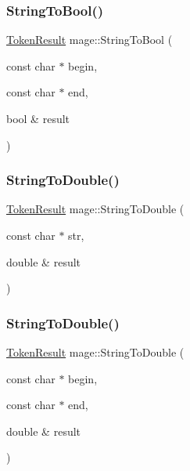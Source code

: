 \hypertarget{namespacemage_a5deef7799d080b8c98c9ead54fbcb6db}{}\label{namespacemage_a5deef7799d080b8c98c9ead54fbcb6db} 
\subsubsection{\texorpdfstring{String\+To\+Bool()}{StringToBool()}\hspace{0.1cm}{\footnotesize\ttfamily [2/2]}}
{\footnotesize\ttfamily \hyperlink{namespacemage_a2178ba2411db5912f41b2e7698c2037d}{Token\+Result} mage\+::\+String\+To\+Bool (\begin{DoxyParamCaption}\item[{const char $\ast$}]{begin,  }\item[{const char $\ast$}]{end,  }\item[{bool \&}]{result }\end{DoxyParamCaption})}

\hypertarget{namespacemage_a49403be4dcbd136ffb13f62669576c50}{}\label{namespacemage_a49403be4dcbd136ffb13f62669576c50} 
\subsubsection{\texorpdfstring{String\+To\+Double()}{StringToDouble()}\hspace{0.1cm}{\footnotesize\ttfamily [1/2]}}
{\footnotesize\ttfamily \hyperlink{namespacemage_a2178ba2411db5912f41b2e7698c2037d}{Token\+Result} mage\+::\+String\+To\+Double (\begin{DoxyParamCaption}\item[{const char $\ast$}]{str,  }\item[{double \&}]{result }\end{DoxyParamCaption})}

\hypertarget{namespacemage_aaee12fa175aece0a6ffbaa8df4e63b60}{}\label{namespacemage_aaee12fa175aece0a6ffbaa8df4e63b60} 
\subsubsection{\texorpdfstring{String\+To\+Double()}{StringToDouble()}\hspace{0.1cm}{\footnotesize\ttfamily [2/2]}}
{\footnotesize\ttfamily \hyperlink{namespacemage_a2178ba2411db5912f41b2e7698c2037d}{Token\+Result} mage\+::\+String\+To\+Double (\begin{DoxyParamCaption}\item[{const char $\ast$}]{begin,  }\item[{const char $\ast$}]{end,  }\item[{double \&}]{result }\end{DoxyParamCaption})}

